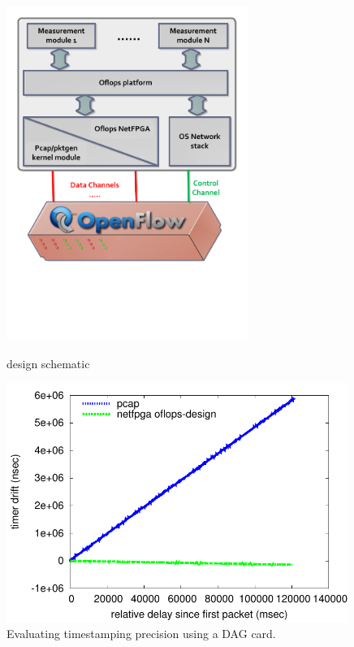 \begin{figure}
\centering
\vspace{-.25in}
\begin{minipage}[b]{0.49\linewidth}
\centering
 \includegraphics[width=0.70\textwidth]{openflow-design} 
\caption{\oflops design schematic}
\label{fig:oflops_design}
\end{minipage}
\begin{minipage}[b]{0.49\linewidth}
\centering
 \includegraphics[width=0.99\textwidth]{timer_precision} 
 \caption{Evaluating timestamping precision using a DAG card.}
\label{fig:timestamping}
\end{minipage}
\vspace{-.20in}
\end{figure}

